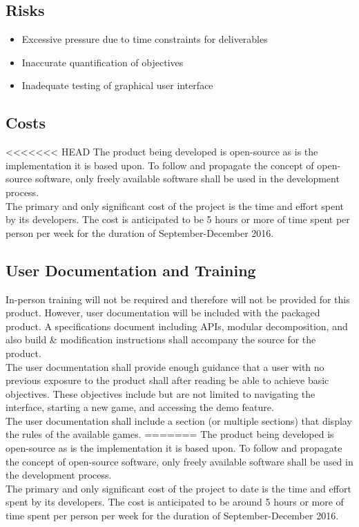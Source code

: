 \documentclass{article}
\begin{document}
		\subsection{Risks}
		\begin{itemize}
			\itemsep0em
			\item Excessive pressure due to time constraints for deliverables
			\item Inaccurate quantification of objectives
			\item Inadequate testing of graphical user interface
		\end{itemize}

		\subsection{Costs}
<<<<<<< HEAD
		\indent \indent The product being developed is open-source as is the implementation it is based upon. To follow and propagate the concept of open-source software, only freely available software shall be used in the development process. \\
		\indent The primary and only significant cost of the project is the time and effort spent by its developers. The cost is anticipated to be 5 hours or more of time spent per person per week for the duration of September-December 2016.\\

		\subsection{User Documentation and Training}
		\indent \indent In-person training will not be required and therefore will not be provided for this product. However, user documentation will be included with the packaged product. A specifications document including APIs, modular decomposition, and also build & modification instructions shall accompany the source for the product.\\
 		\indent The user documentation shall provide enough guidance that a user with no previous exposure to the product shall after reading be able to achieve basic objectives. These objectives include but are not limited to navigating the interface, starting a new game, and accessing the demo feature.\\
 		\indent The user documentation shall include a section (or multiple sections) that display the rules of the available games.
=======
			\indent The product being developed is open-source as is the implementation
			it is based upon. To follow and propagate the concept of open-source
			software, only freely available software shall be used in the development
			process.\\
			\indent The primary and only significant cost of the project to date is the
			time and effort spent by its developers. The cost is anticipated to be around
			5 hours or more of time spent per person per week for the duration of
			September-December 2016.\\
\end{document}

